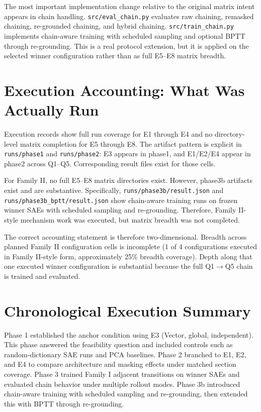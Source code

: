 \documentclass[11pt]{article}
\begin{document}
The most important implementation change relative to the original matrix intent appears in chain handling. \texttt{src/eval\_chain.py} evaluates raw chaining, remasked chaining, re-grounded chaining, and hybrid chaining. \texttt{src/train\_chain.py} implements chain-aware training with scheduled sampling and optional BPTT through re-grounding. This is a real protocol extension, but it is applied on the selected winner configuration rather than as full E5--E8 matrix breadth.

\section{Execution Accounting: What Was Actually Run}
Execution records show full run coverage for E1 through E4 and no directory-level matrix completion for E5 through E8. The artifact pattern is explicit in \texttt{runs/phase1} and \texttt{runs/phase2}: E3 appears in phase1, and E1/E2/E4 appear in phase2 across Q1--Q5. Corresponding result files exist for those cells.

For Family II, no full E5--E8 matrix directories exist. However, phase3b artifacts exist and are substantive. Specifically, \texttt{runs/phase3b/result.json} and \texttt{runs/phase3b\_bptt/result.json} show chain-aware training runs on frozen winner SAEs with scheduled sampling and re-grounding. Therefore, Family II-style mechanism work was executed, but matrix breadth was not completed.

The correct accounting statement is therefore two-dimensional. Breadth across planned Family II configuration cells is incomplete (1 of 4 configurations executed in Family II-style form, approximately 25\% breadth coverage). Depth along that one executed winner configuration is substantial because the full Q1$\rightarrow$Q5 chain is trained and evaluated.

\section{Chronological Execution Summary}
Phase 1 established the anchor condition using E3 (Vector, global, independent). This phase answered the feasibility question and included controls such as random-dictionary SAE runs and PCA baselines. Phase 2 branched to E1, E2, and E4 to compare architecture and masking effects under matched section coverage. Phase 3 trained Family I adjacent transitions on winner SAEs and evaluated chain behavior under multiple rollout modes. Phase 3b introduced chain-aware training with scheduled sampling and re-grounding, then extended this with BPTT through re-grounding.
\end{document}
